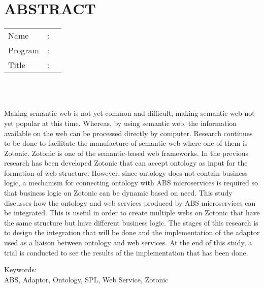 %
%
%

	\chapter*{ABSTRACT}

\vspace*{0.2cm}

\noindent \begin{tabular}{l l p{11.0cm}}
	Name&: & \penulis \\
	Program&: & \programEng \\
	Title&: & \judulInggris \\
\end{tabular} \\ 

\vspace*{0.5cm}

\noindent 
\\ Making semantic web is not yet common and difficult, making semantic web not yet popular at this time. Whereas, by using semantic web, the information available on the web can be processed directly by computer. Research continues to be done to facilitate the manufacture of semantic web where one of them is Zotonic. Zotonic is one of the semantic-based web frameworks. In the previous research has been developed Zotonic that can accept ontology as input for the formation of web structure. However, since ontology does not contain business logic, a mechanism for connecting ontology with ABS microservices is required so that business logic on Zotonic can be dynamic based on need. This study discusses how the ontology and web services produced by ABS microservices can be integrated. This is useful in order to create multiple webs on Zotonic that have the same structure but have different business logic. The stages of this research is to design the integration that will be done and the implementation of the adaptor used as a liaison between ontology and web services. At the end of this study, a trial is conducted to see the results of the implementation that has been done.

\vspace*{0.2cm}

\noindent Keywords: \\ 
\noindent ABS, Adaptor, Ontology, SPL, Web Service, Zotonic\\

\newpage
